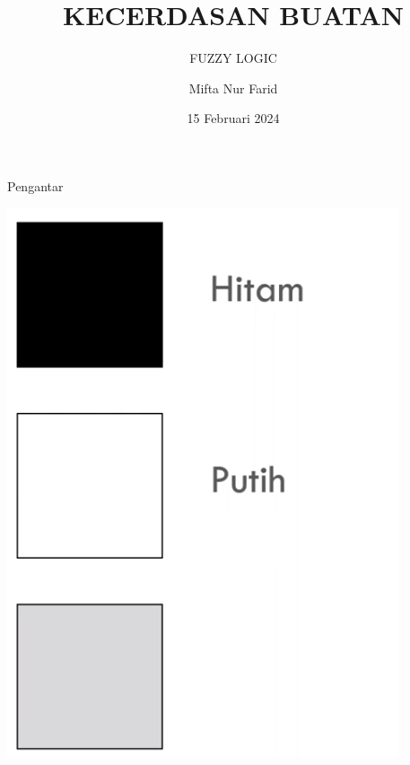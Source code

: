 \documentclass[pdflatex,compress,mathserif]{beamer}
\title{KECERDASAN BUATAN}
\subtitle{FUZZY LOGIC}
\author{Mifta Nur Farid}
\date{15 Februari 2024}
\begin{document}
\maketitle

\begin{frame}{Pengantar}
	\begin{center}
		\includegraphics[height=0.7\textheight]{img/01}
	\end{center}
\end{frame}
\end{document}

